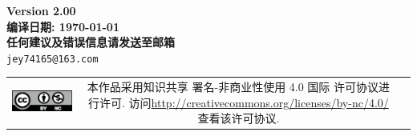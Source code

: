 \documentclass{qbook}
\begin{document}
\pagestyle{empty}
\begin{center}
	\Large{\sffamily\bfseries\heiti Version 2.00} \\ \vspace{2em}
	\Large{\sffamily\bfseries\heiti 编译日期: \today} \\ \vspace{1em}
	\Large{\sffamily\bfseries\heiti 任何建议及错误信息请发送至邮箱} \\
	\texttt{jey74165@163.com}
\end{center}
\vfill
\vspace{30em}
\begin{tabular*}{\textwidth}{ccc}
	\includegraphics{figure/by-nc.eps}
	& \begin{minipage}[b]{0.6\textwidth}
		\small\sffamily
		本作品采用知识共享 署名-非商业性使用 4.0 国际 许可协议进行许可. 访问\url{http://creativecommons.org/licenses/by-nc/4.0/  }查看该许可协议.
	\end{minipage}
\end{tabular*}
\thispagestyle{empty}
\frontmatter  %
\pagestyle{empty}

\pagestyle{empty}
\tableofcontents
\cleardoublepage

\mainmatter	  %
\pagestyle{fancy}
\setcounter{page}{0}




%
%
%
%
%
%
\backmatter	
\printbibliography[heading=bibintoc]
\makeatletter
\makeatother
\end{document}
